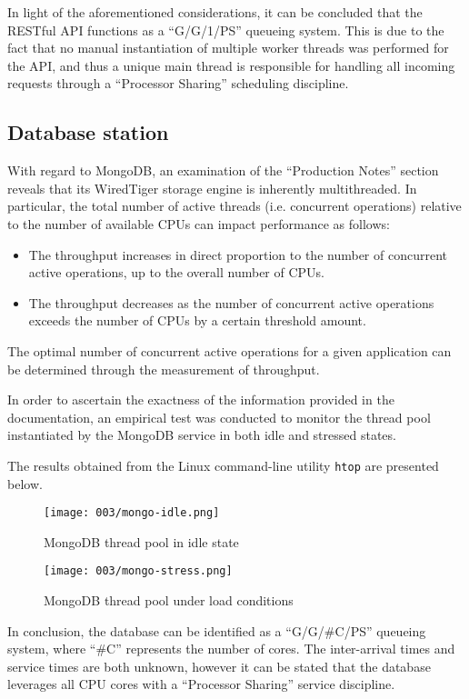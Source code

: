 In light of the aforementioned considerations, it can be concluded that the RESTful API functions as a ``G/G/1/PS'' queueing system.
This is due to the fact that no manual instantiation of multiple worker threads was performed for the API, and thus a unique main thread is responsible for handling all incoming requests through a ``Processor Sharing'' scheduling discipline.

\subsection{Database station}

With regard to MongoDB, an examination of the ``Production Notes'' section reveals that its WiredTiger storage engine is inherently multithreaded.
In particular, the total number of active threads (i.e. concurrent operations) relative to the number of available CPUs can impact performance as follows:

\begin{itemize}
	\item The throughput increases in direct proportion to the number of concurrent active operations, up to the overall number of CPUs.
	\item The throughput decreases as the number of concurrent active operations exceeds the number of CPUs by a certain threshold amount.
\end{itemize}

The optimal number of concurrent active operations for a given application can be determined through the measurement of throughput.

In order to ascertain the exactness of the information provided in the documentation, an empirical test was conducted to monitor the thread pool instantiated by the MongoDB service in both idle and stressed states.

The results obtained from the Linux command-line utility \verb|htop| are presented below.

\begin{figure}[h]
    \centering
    \texttt{[image: 003/mongo-idle.png]}
    \caption{MongoDB thread pool in idle state}
\end{figure}

\begin{figure}[h]
	\centering
	\texttt{[image: 003/mongo-stress.png]}
	\caption{MongoDB thread pool under load conditions}
\end{figure}	

In conclusion, the database can be identified as a ``G/G/\#C/PS'' queueing system, where ``\#C'' represents the number of cores.
The inter-arrival times and service times are both unknown, however it can be stated that the database leverages all CPU cores with a ``Processor Sharing'' service discipline.
